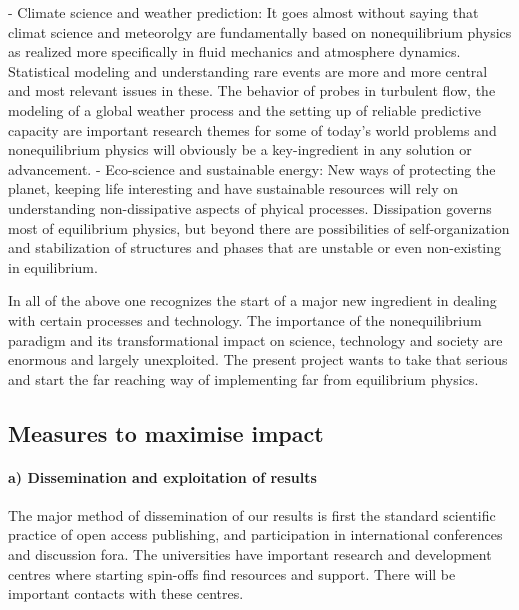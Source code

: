 - Climate science and weather prediction: It goes almost without saying that climat science and meteorolgy are fundamentally based on nonequilibrium physics as realized more specifically in fluid mechanics and atmosphere dynamics. Statistical modeling and understanding rare events are more and more central and most relevant issues in these. The behavior of probes in turbulent flow, the modeling of a global weather process and the setting up of reliable predictive capacity  are important research themes for some of today's world problems and nonequilibrium physics will obviously be a key-ingredient in any solution or advancement. 
- Eco-science and sustainable energy: New ways of protecting the planet, keeping life interesting and have sustainable resources will rely on understanding non-dissipative aspects of phyical processes.  Dissipation governs most of equilibrium physics, but beyond there are possibilities of self-organization and stabilization of structures and phases that are unstable or even non-existing in equilibrium.  

In all of the above one recognizes the start of a major new ingredient in dealing with certain processes and technology.  The importance of the nonequilibrium paradigm and its transformational impact on science, technology and society are enormous and largely unexploited.  The present project wants to take that serious and start the far reaching way of implementing far from equilibrium physics. 




\subsection{Measures to maximise impact}

\paragraph{a) Dissemination and exploitation of results}

The major method of dissemination of our results is first the standard scientific practice of open access publishing, and participation in international conferences and discussion fora.  
The universities have important research and development centres where starting spin-offs find resources and support.
There will be important contacts with these centres.  

